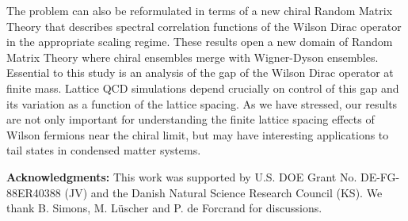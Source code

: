 \documentclass[aps,prl,twocolumn,superscriptaddress,preprintnumbers,floatfix,nofootinbib]{revtex4}
\begin{document}
The problem can also
be reformulated in terms of a new chiral Random Matrix Theory that 
describes spectral correlation functions of the Wilson Dirac
operator in the appropriate scaling regime. These results 
open  a new domain of Random Matrix Theory where chiral
ensembles merge with Wigner-Dyson  ensembles. Essential to this
study is an analysis of the gap of the Wilson Dirac operator at 
finite mass. Lattice QCD simulations depend crucially
on control of this gap and its variation as a function of the lattice spacing. 
As we have stressed, our results are not only important for 
understanding the finite lattice spacing effects
of Wilson fermions near the chiral limit, 
but may have interesting applications to
tail states in condensed matter systems. 


\noindent
{\bf Acknowledgments:}
This work was supported by U.S. DOE Grant No. DE-FG-88ER40388 (JV) and the 
Danish Natural Science Research Council (KS).  We thank B. Simons, 
M. L\"uscher and P. de Forcrand for discussions.
\end{document}
